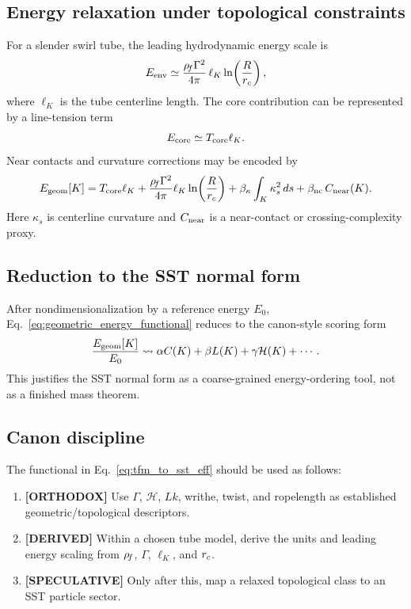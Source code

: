 \subsection{Energy relaxation under topological constraints}
For a slender swirl tube, the leading hydrodynamic energy scale is
\begin{equation}
    E_{\rm env}
    \simeq
    \frac{\rho_{\!f}\Gamma^2}{4\pi}\,\ell_K\ln\!\left(\frac{R}{r_c}\right),
    \label{eq:env_energy_tfm}
\end{equation}
where $\ell_K$ is the tube centerline length. The core contribution can be represented by a line-tension term
\begin{equation}
    E_{\rm core}\simeq T_{\rm core}\ell_K.
    \label{eq:core_line_tension}
\end{equation}
Near contacts and curvature corrections may be encoded by
\begin{equation}
    E_{\rm geom}[K]
    =T_{\rm core}\ell_K
    +\frac{\rho_{\!f}\Gamma^2}{4\pi}\ell_K\ln\!\left(\frac{R}{r_c}\right)
    +\beta_{\kappa}\int_K \kappa_s^2\,ds
    +\beta_{\rm nc}\,C_{\rm near}(K).
    \label{eq:geometric_energy_functional}
\end{equation}
Here $\kappa_s$ is centerline curvature and $C_{\rm near}$ is a near-contact or crossing-complexity proxy.

\subsection{Reduction to the SST normal form}
After nondimensionalization by a reference energy $E_0$, Eq.~\eqref{eq:geometric_energy_functional} reduces to the canon-style scoring form
\begin{equation}
    \frac{E_{\rm geom}[K]}{E_0}
    \leadsto
    \alpha C(K)+\beta L(K)+\gamma\mathcal H(K)+\cdots.
    \label{eq:tfm_to_sst_eff}
\end{equation}
This justifies the SST normal form as a coarse-grained energy-ordering tool, not as a finished mass theorem.

\subsection{Canon discipline}
The functional in Eq.~\eqref{eq:tfm_to_sst_eff} should be used as follows:
\begin{enumerate}
    \item \textbf{[ORTHODOX]} Use $\Gamma$, $\mathcal H$, $Lk$, writhe, twist, and ropelength as established geometric/topological descriptors.
    \item \textbf{[DERIVED]} Within a chosen tube model, derive the units and leading energy scaling from $\rho_{\!f}$, $\Gamma$, $\ell_K$, and $r_c$.
    \item \textbf{[SPECULATIVE]} Only after this, map a relaxed topological class to an SST particle sector.
\end{enumerate}

